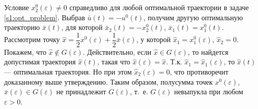 \documentclass[../main.tex]{subfiles}
\begin{document}
Условие $ x_2^0(\varepsilon) \neq 0 $ справедливо для любой оптимальной траектории в задаче \eqref{s1:opt_problem}. 
Выбрав $ \bar{u}(t) = -u^0(t) $, получим другую оптимальную траекторию $ \bar{x}(t) $, для которой $ \bar{x}_2(t) = -x_2^0(t) $, $ \bar{x}_1(t) = x_1^0(t) $.
Рассмотрим точку $ \hat{x} = \dfrac{1}{2}x^0(\varepsilon) + \dfrac{1}{2}\bar{x}(\varepsilon) $, у которой $ \hat{x}_1 = x_1^0(\varepsilon) $, $ \hat{x}_2 = 0 $. 
Покажем, что $ \hat{x} \notin G(\varepsilon) $. 
Действительно, если $ \hat{x} \in G(\varepsilon) $, то найдется допустимая траектория $ \hat{x}(t) $, такая что $ \hat{x}(\varepsilon) = \hat{x} $. 
Т.к. $ \hat{x}_1 = \hat{x}_1(\varepsilon) $, то $ \hat{x}(t) $ --- оптимальная траектория. 
Но при этом $ \hat{x}_2(\varepsilon) = 0 $, что противоречит доказанному выше утверждению. 
Таким образом, полусумма точек $ x^0(\varepsilon) $, $ \bar{x}(\varepsilon) \in G(\varepsilon) $ не принадлежит $ G(\varepsilon) $, т.~е. $ G(\varepsilon) $ невыпукла при любом $ \varepsilon > 0 $.




 
\end{document}
